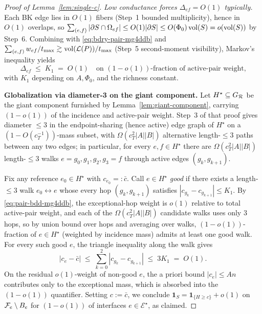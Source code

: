 \begin{proof}[Proof of Lemma~\ref{lem:single-c}]
\emph{Low conductance forces $\Delta_{ef}=O(1)$ typically.}
Each BK edge lies in $O(1)$ fibers (Step~1 bounded multiplicity),
hence in $O(1)$ overlaps, so
$\sum_{(e,f)}|\partial S\cap\Omega_{ef}|\le O(1)|\partial S|\le
O(\Phi_0)\operatorname{vol}(S)=o(\operatorname{vol}(S))$ by Step~6.  Combining with
\eqref{eq:bdry-pair-mg4ddb} and $\sum_{(e,f)}w_{ef}/t_{\max}\gtrsim
\operatorname{vol}(\mathcal{L}(P))/t_{\max}$ (Step~5 second-moment visibility),
Markov's inequality yields
\begin{equation}\label{eq:pair-bdd-mg4ddb}
  \Delta_{ef}\;\le\;K_1\;=\;O(1)\quad\text{on $(1-o(1))$-fraction of
  active-pair weight,}
\end{equation}
with $K_1$ depending on $A,\Phi_0$, and the richness constant.

\textbf{Globalization via diameter-3 on the giant component.}
Let $H^\star\subseteq G_{\mathcal{R}}$ be the giant component furnished by
Lemma~\ref{lem:giant-component}, carrying $(1-o(1))$ of the
incidence and active-pair weight.  Step~3 of that proof gives diameter
$\le 3$ in the endpoint-sharing (hence active) edge graph of
$H^\star$ on a $(1-O(c_T^{-1}))$-mass subset, with
$\Omega(c_T^2|A||B|)$ alternative length-$\le 3$ paths between any
two edges; in particular, for every $e,f\in H^\star$ there are
$\Omega(c_T^2|A||B|)$ length-$\le 3$ walks
$e=g_0,g_1,g_2,g_3=f$ through active edges $(g_k,g_{k+1})$.

Fix any reference $e_0\in H^\star$ with $c_{e_0}=:\bar c$.  Call
$e\in H^\star$ \emph{good} if there exists a length-$\le 3$ walk
$e_0\leftrightarrow e$ whose every hop $(g_k,g_{k+1})$ satisfies
$|c_{g_k}-c_{g_{k+1}}|\le K_1$.  By
\eqref{eq:pair-bdd-mg4ddb}, the exceptional-hop weight is $o(1)$
relative to total active-pair weight, and each of the
$\Omega(c_T^2|A||B|)$ candidate walks uses only $3$ hops, so by
union bound over hops and averaging over walks,
$(1-o(1))$-fraction of $e\in H^\star$ (weighted by incidence mass)
admits at least one good walk.  For every such good $e$, the
triangle inequality along the walk gives
\[
  |c_e-\bar c|\;\le\;\sum_{k=0}^{2}|c_{g_k}-c_{g_{k+1}}|
  \;\le\;3K_1\;=\;O(1).
\]
On the residual $o(1)$-weight of non-good $e$, the a priori bound
$|c_e|\le An$ contributes only to the exceptional mass, which is
absorbed into the $(1-o(1))$ quantifier.  Setting $c:=\bar c$, we
conclude
$\mathbf{1}_S=\mathbf{1}_{\{H\ge c\}}+o(1)$ on
$\mathcal{F}_{e}\setminus B_e$ for $(1-o(1))$ of interfaces
$e\in\mathcal{E}^\star$, as claimed.
\end{proof}

